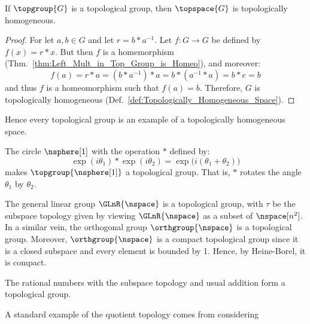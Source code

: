        \begin{theorem}
            \label{thm:Top_Groups_are_Homogeneous}%
            If $\topgroup{G}$ is a topological group, then $\topspace{G}$ is
            topologically homogeneous.
        \end{theorem}
        \begin{proof}
            For let $a,b\in{G}$ and let $r=b*a^{\minus{1}}$. Let
            $f:G\rightarrow{G}$ be defined by $f(x)=r*x$. But then $f$ is a
            homemorphism (Thm.~\ref{thm:Left_Mult_in_Top_Group_is_Homeo}), and
            moreover:
            \begin{equation}
                f(a)=r*a=(b*a^{\minus{1}})*a=b*(a^{\minus{1}}*a)=b*e=b
            \end{equation}
            and thus $f$ is a homeomorphism such that $f(a)=b$. Therefore, $G$
            is topologically homogeneous
            (Def.~\ref{def:Topologically_Homogeneous_Space}).
        \end{proof}
        Hence every topological group is an example of a topologically
        homogeneous space.
        \begin{example}
            The circle $\nsphere[1]$ with the operation $*$ defined by:
            \begin{equation}
                \exp(i\theta_{1})*\exp(i\theta_{2})=
                \exp\big(i(\theta_{1}+\theta_{2})\big)
            \end{equation}
            makes $\topgroup{\nsphere[1]}$ a topological group. That is,
            $*$ rotates the angle $\theta_{1}$ by $\theta_{2}$.
        \end{example}
        \begin{example}
            The general linear group $\GLnR{\nspace}$ is a topological group,
            with $\tau$ be the subspace topology given by viewing
            $\GLnR{\nspace}$ as a subset of $\nspace[n^{2}]$. In a similar vein,
            the orthogonal group $\orthgroup{\nspace}$ is a topological group.
            Moreover, $\orthgroup{\nspace}$ is a compact topological group since
            it is a closed subspace and every element is bounded by 1. Hence,
            by Heine-Borel, it is compact.
        \end{example}
        \begin{example}
            The rational numbers with the subspace topology and usual addition
            form a topological group.
        \end{example}
        A standard example of the quotient topology comes from considering
